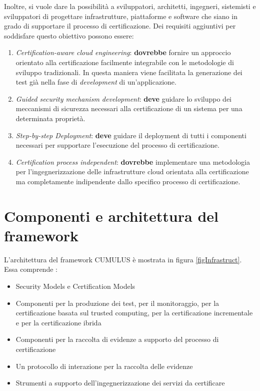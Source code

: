 \documentclass[../main.tex]{subfiles}
\begin{document}
Inoltre, si vuole dare la possibilità a sviluppatori, architetti, ingegneri, sistemisti e sviluppatori di progettare infrastrutture, piattaforme e software che siano in grado di supportare il processo di certificazione.
Dei requisiti aggiuntivi per soddisfare questo obiettivo possono essere:
\begin{enumerate}
\item \textit{Certification-aware cloud engineering}: \textbf{dovrebbe} fornire un approccio orientato alla certificazione facilmente integrabile con le metodologie di sviluppo  tradizionali. In questa maniera viene facilitata la generazione dei test già nella fase di \textit{development} di un'applicazione.
\item \textit{Guided security mechanism development}: \textbf{deve} guidare lo sviluppo dei meccanismi di sicurezza necessari alla certificazione di un sistema per una determinata proprietà.
\item \textit{Step-by-step Deployment}: \textbf{deve} guidare il deployment di tutti i componenti necessari per supportare l'esecuzione del processo di certificazione.
\item \textit{Certification process independent}: \textbf{dovrebbe} implementare una metodologia per l'ingegnerizzazione delle infrastrutture cloud orientata alla certificazione ma completamente indipendente dallo specifico processo di certificazione.
\end{enumerate}

\section{Componenti e architettura del framework}
L'architettura del framework CUMULUS è mostrata in figura \ref{figInfrastruct}. Essa comprende \cite{SpanoudakisDamiani}:
\begin{itemize}
\item Security Models e Certification Models
\item Componenti per la produzione dei test, per il monitoraggio, per la certificazione basata sul trusted computing, per la certificazione incrementale e per la certificazione ibrida
\item Componenti per la raccolta di evidenze a supporto del processo di certificazione
\item Un protocollo di interazione per la raccolta delle evidenze
\item Strumenti a supporto dell'ingegnerizzazione dei servizi da certificare
\end{itemize}
\end{document}
